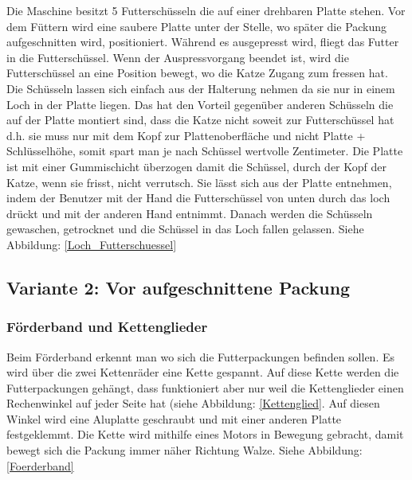 Die Maschine besitzt 5 Futterschüsseln die auf einer drehbaren Platte stehen. Vor dem Füttern wird eine saubere Platte unter der Stelle, wo später die Packung aufgeschnitten wird, positioniert. Während es ausgepresst wird, fliegt das Futter in die Futterschüssel. Wenn der Auspressvorgang beendet ist, wird die Futterschüssel an eine Position bewegt, wo die Katze Zugang zum fressen hat. Die Schüsseln lassen sich einfach aus der Halterung nehmen da sie nur in einem Loch in der Platte liegen. Das hat den Vorteil gegenüber anderen Schüsseln die auf der Platte montiert sind, dass die Katze nicht soweit zur Futterschüssel hat d.h. sie muss nur mit dem Kopf zur Plattenoberfläche und nicht Platte + Schlüsselhöhe, somit spart man je nach Schüssel wertvolle Zentimeter. Die Platte ist mit einer Gummischicht überzogen damit die Schüssel, durch der Kopf der Katze, wenn sie frisst, nicht verrutsch. Sie lässt sich aus der Platte entnehmen, indem der Benutzer mit der Hand die Futterschüssel von unten durch das loch drückt und mit der anderen Hand entnimmt. Danach werden die Schüsseln gewaschen, getrocknet und die Schüssel in das Loch fallen gelassen. Siehe Abbildung: \ref{Loch_Futterschuessel}

\newpage

\subsection{Variante 2: Vor aufgeschnittene Packung }

\subsubsection{Förderband und Kettenglieder}

Beim Förderband erkennt man wo sich die Futterpackungen befinden sollen. Es wird über die zwei Kettenräder eine Kette gespannt. Auf diese Kette werden die Futterpackungen gehängt, dass funktioniert aber nur weil die Kettenglieder einen Rechenwinkel auf jeder Seite hat (siehe Abbildung: \ref{Kettenglied}. Auf diesen Winkel wird eine Aluplatte geschraubt und mit einer anderen Platte festgeklemmt. Die Kette wird mithilfe eines Motors in Bewegung gebracht, damit bewegt sich die Packung immer näher Richtung Walze. Siehe Abbildung: \ref{Foerderband}

